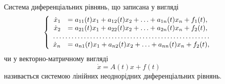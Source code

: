 Система диференціальних рівнянь, що записана у вигляді 
\begin{equation*}
	\left\{
		\begin{array}{rl}
			\dot x_1 &= a_{11}(t) x_1 + a_{12}(t) x_2 + \ldots + a_{1n}(t) x_n + f_1(t), \\
			\dot x_2 &= a_{21}(t) x_1 + a_{22}(t) x_2 + \ldots + a_{2n}(t) x_n + f_2(t), \\
			\hdotsfor{2} \\
			\dot x_n &= a_{n1}(t) x_1 + a_{n2}(t) x_2 + \ldots + a_{nn}(t) x_n + f_2(t),
		\end{array}
	\right.
\end{equation*} 
чи у векторно-матричному вигляді
\begin{equation*}
	\dot x = A(t) x + f(t)
\end{equation*}
називається системою лінійних неоднорідних диференціальних рівнянь.
